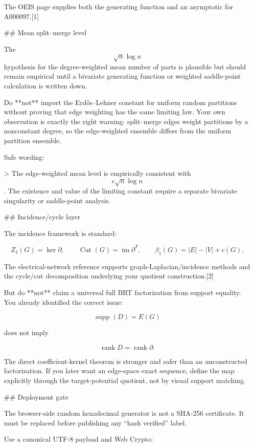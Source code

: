 The OEIS page supplies both the generating function and an asymptotic for A000097.[1]

## Mean split–merge level

The $$\sqrt n\log n$$ hypothesis for the degree-weighted mean number of parts is plausible but should remain empirical until a bivariate generating function or weighted saddle-point calculation is written down.

Do **not** import the Erdős–Lehner constant for uniform random partitions without proving that edge weighting has the same limiting law. Your own observation is exactly the right warning: split–merge edges weight partitions by a nonconstant degree, so the edge-weighted ensemble differs from the uniform partition ensemble.

Safe wording:

> The edge-weighted mean level is empirically consistent with $$c\sqrt n\log n$$. The existence and value of the limiting constant require a separate bivariate singularity or saddle-point analysis.

## Incidence/cycle layer

The incidence framework is standard:

$$
Z_1(G)=\ker\partial,
\qquad
\operatorname{Cut}(G)=\operatorname{im}\partial^T,
\qquad
\beta_1(G)=|E|-|V|+c(G).
$$

The electrical-network reference supports graph-Laplacian/incidence methods and the cycle/cut decomposition underlying your quotient construction.[2]

But do **not** claim a universal full BRT factorization from support equality. You already identified the correct issue:

$$
\operatorname{supp}(D)=E(G)
$$

does not imply

$$
\operatorname{rank}D=\operatorname{rank}\partial.
$$

The direct coefficient-kernel theorem is stronger and safer than an unconstructed factorization. If you later want an edge-space exact sequence, define the map explicitly through the target-potential quotient, not by visual support matching.

## Deployment gate

The browser-side random hexadecimal generator is not a SHA-256 certificate. It must be replaced before publishing any “hash verified” label.

Use a canonical UTF-8 payload and Web Crypto:


